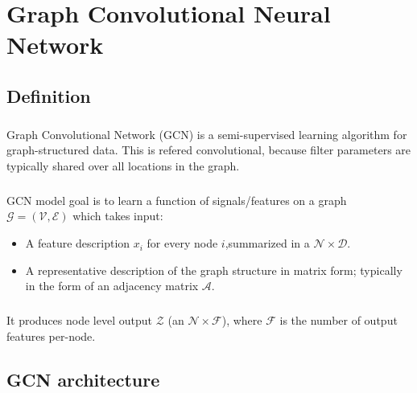 \chapter{Graph Convolutional Neural Network}
\section{Definition}
\paragraph{} Graph Convolutional Network (GCN) is a semi-supervised learning algorithm for graph-structured data. This is
refered convolutional, because filter parameters are typically shared over all locations in the graph.
\paragraph{} GCN model goal is to learn a function of signals/features on a graph $\mathcal{G}=(\mathcal{V},\mathcal{E})$
which takes input:
\begin{itemize}
    \item A feature description $x_i$ for every node $i$,summarized in a $\mathcal{N} \times \mathcal{D}$.
    \item A representative description of the graph structure in matrix form; typically in the form of an adjacency matrix $\mathcal{A}$.
\end{itemize}
\paragraph{} It produces node level output $\mathcal{Z}$ (an $\mathcal{N} \times \mathcal{F}$), where $\mathcal{F}$ is the 
number of output features per-node.
\section{GCN architecture}